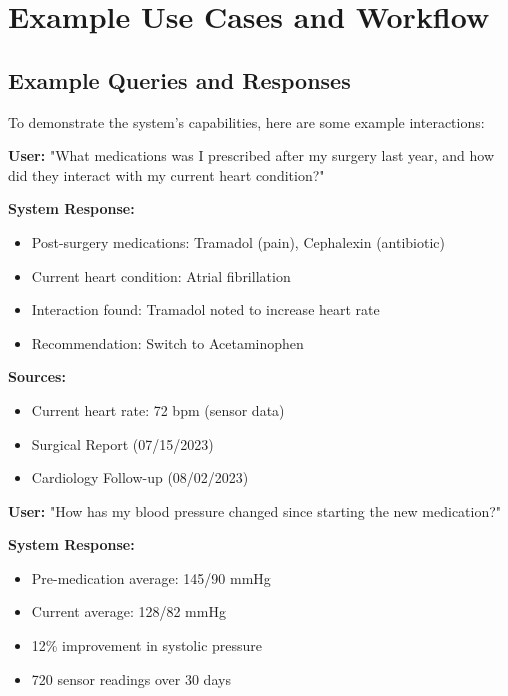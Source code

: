 \section{Example Use Cases and Workflow}
\subsection{Example Queries and Responses}

To demonstrate the system's capabilities, here are some example interactions:

\begin{tcolorbox}[title=Query 1: Complex Medical History]
\textbf{User:} "What medications was I prescribed after my surgery last year, and how did they interact with my current heart condition?"

\textbf{System Response:}
\begin{itemize}
    \item Post-surgery medications: Tramadol (pain), Cephalexin (antibiotic)
    \item Current heart condition: Atrial fibrillation
    \item Interaction found: Tramadol noted to increase heart rate
    \item Recommendation: Switch to Acetaminophen
\end{itemize}

\textbf{Sources:}
\begin{itemize}
    \item Current heart rate: 72 bpm (sensor data)
    \item Surgical Report (07/15/2023)
    \item Cardiology Follow-up (08/02/2023)
\end{itemize}
\end{tcolorbox}

\begin{tcolorbox}[title=Query 2: Data Integration]
\textbf{User:} "How has my blood pressure changed since starting the new medication?"

\textbf{System Response:}
\begin{itemize}
    \item Pre-medication average: 145/90 mmHg
    \item Current average: 128/82 mmHg
    \item 12\% improvement in systolic pressure
    \item 720 sensor readings over 30 days
\end{itemize}
\end{tcolorbox}

